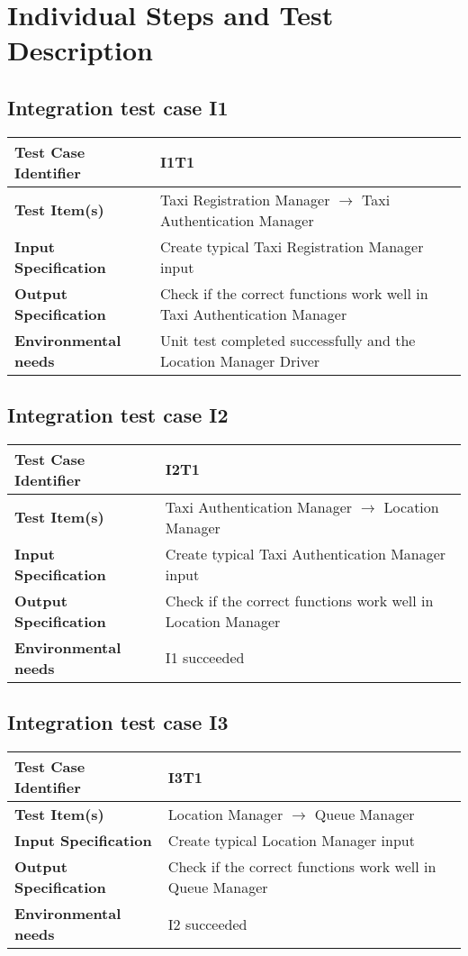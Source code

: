 \section{Individual Steps and Test Description}
\subsection{Integration test case I1}
\begin{tabular} {l p{9cm}}
	\hline \textbf{Test Case Identifier} & I1T1 \\
	\hline \textbf{Test Item(s)} & Taxi Registration Manager $\rightarrow$ Taxi Authentication Manager  \\
	\hline \textbf{Input Specification} & Create typical Taxi Registration Manager input \\
	\hline \textbf{Output Specification} & Check if the correct functions work well in Taxi Authentication Manager \\
	\hline \textbf{Environmental needs} & Unit test completed successfully and the Location Manager Driver \\
	\hline 
\end{tabular}
\subsection{Integration test case I2}
\begin{tabular} {l p{9cm}}
	\hline \textbf{Test Case Identifier} & I2T1 \\
	\hline \textbf{Test Item(s)} & Taxi Authentication Manager $\rightarrow$ Location Manager \\
	\hline \textbf{Input Specification} & Create typical Taxi Authentication Manager input \\
	\hline \textbf{Output Specification} & Check if the correct functions work well in Location Manager \\
	\hline \textbf{Environmental needs} & I1 succeeded \\
	\hline 
\end{tabular}
\subsection{Integration test case I3}
\begin{tabular} {l p{9cm}}
	\hline \textbf{Test Case Identifier} & I3T1 \\
	\hline \textbf{Test Item(s)} & Location Manager $\rightarrow$ Queue Manager \\
	\hline \textbf{Input Specification} & Create typical Location Manager input \\
	\hline \textbf{Output Specification} & Check if the correct functions work well in Queue Manager \\
	\hline \textbf{Environmental needs} & I2 succeeded \\
	\hline 
\end{tabular}

